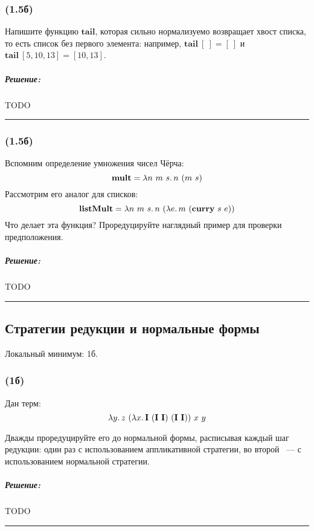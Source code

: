 \documentclass{article}
\newenvironment{proof}{\subparagraph{\hspace{-1em}Решение:\newline}}{\par\noindent\rule{\textwidth}{0.4pt}}
\newcommand{\comb}[1]{\mathbf{#1}}
\newcommand{\term}[1]{\mathbf{#1}}
\begin{document}
    \subsubsection{(1.5б)}

    Напишите функцию $\term{tail}$, которая сильно нормализуемо возвращает хвост списка, то есть список без первого элемента: например, $\term{tail}~[~] = [~]$ и $\term{tail}~[5,10,13] = [10, 13]$.

    \begin{proof}
        TODO %
    \end{proof}

    \subsubsection{(1.5б)}

    Вспомним определение умножения чисел Чёрча:
    \[\term{mult} = \lambda n~m~s\ldotp n~(m~s)\]
    Рассмотрим его аналог для списков:
    \[\term{listMult} = \lambda n~m~s\ldotp n~(\lambda e\ldotp m~(\term{curry}~s~e))\]
    Что делает эта функция?
    Проредуцируйте наглядный пример для проверки предположения.

    \begin{proof}
        TODO %
    \end{proof}

    \subsection{Стратегии редукции и нормальные формы}

    Локальный минимум: 1б.

    \subsubsection{(1б)}

    Дан терм:
    \[\lambda y\ldotp z~(\lambda x\ldotp \comb{I}~(\comb{I}~\comb{I})~(\comb{I}~\comb{I}))~x~y\]

    Дважды проредуцируйте его до нормальной формы, расписывая каждый шаг редукции: один раз с использованием аппликативной стратегии, во второй ~--- с
    использованием нормальной стратегии.

    \begin{proof}
        TODO %
    \end{proof}

    \subsubsection{}
\end{document}

